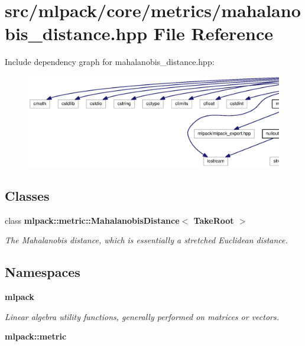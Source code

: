 \section{src/mlpack/core/metrics/mahalanobis\+\_\+distance.hpp File Reference}
\label{mahalanobis__distance_8hpp}
Include dependency graph for mahalanobis\+\_\+distance.\+hpp\+:
\nopagebreak
\begin{figure}[H]
\begin{center}
\leavevmode
\includegraphics[width=350pt]{mahalanobis__distance_8hpp__incl}
\end{center}
\end{figure}
\subsection*{Classes}
\begin{DoxyCompactItemize}
\item 
class {\bf mlpack\+::metric\+::\+Mahalanobis\+Distance$<$ Take\+Root $>$}
\begin{DoxyCompactList}\small\item\em The Mahalanobis distance, which is essentially a stretched Euclidean distance. \end{DoxyCompactList}\end{DoxyCompactItemize}
\subsection*{Namespaces}
\begin{DoxyCompactItemize}
\item 
 {\bf mlpack}
\begin{DoxyCompactList}\small\item\em Linear algebra utility functions, generally performed on matrices or vectors. \end{DoxyCompactList}\item 
 {\bf mlpack\+::metric}
\end{DoxyCompactItemize}
